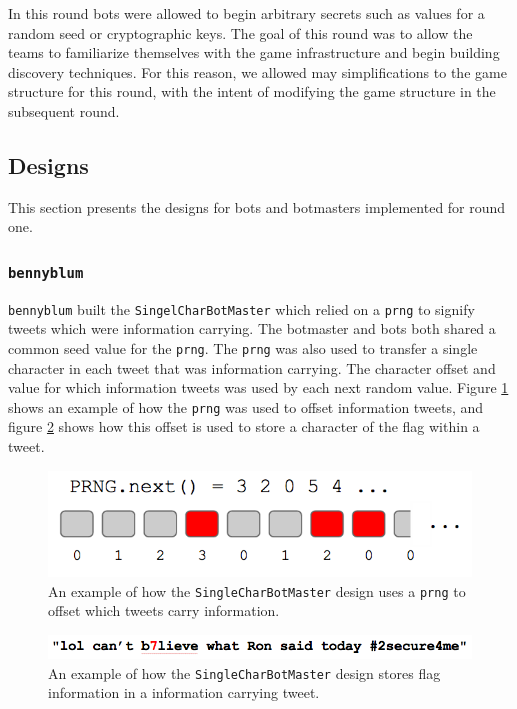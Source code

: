 \documentclass[11pt, oneside]{article} %
\numberwithin{equation}{section} %
\numberwithin{figure}{section} %
\numberwithin{table}{section} %
\renewcommand{\c}[1]{\texttt{#1}}
\newcommand{\teambb}{\c{bennyblum}}
\begin{document}
		In this round bots were allowed to begin arbitrary secrets such as values for a random seed or cryptographic keys. The goal of this round was to allow the teams to familiarize themselves with the game infrastructure and begin building discovery techniques. For this reason, we allowed may simplifications to the game structure for this round, with the intent of modifying the game structure in the subsequent round. 

	\subsection{Designs}
		This section presents the designs for bots and botmasters implemented for round one.
	
		\subsubsection{\teambb{}}
			\teambb{} built the \c{SingelCharBotMaster} which relied on a \c{prng} to signify tweets which were information carrying. The botmaster and bots both shared a common seed value for the \c{prng}. The \c{prng} was also used to transfer a single character in each tweet that was information carrying. The character offset and value for which information tweets was used by each next random value. Figure \ref{fig:prng} shows an example of how the \c{prng} was used to offset information tweets, and figure \ref{fig:prng-tweet-ex} shows how this offset is used to store a character of the flag within a tweet. \\

		\begin{figure}[H]
		    \center\includegraphics[scale=0.70]{resources/prng.png}
		    \caption{An example of how the \c{SingleCharBotMaster} design uses a \c{prng} to offset which tweets carry information.}
		    \label{fig:prng}
		 \end{figure}

		 \begin{figure}[H]
		    \center\includegraphics[scale=0.60]{resources/prng-tweet-ex.png}
		    \caption{An example of how the \c{SingleCharBotMaster} design stores flag information in a information carrying tweet.}
		    \label{fig:prng-tweet-ex}
		 \end{figure}
		
\end{document}
